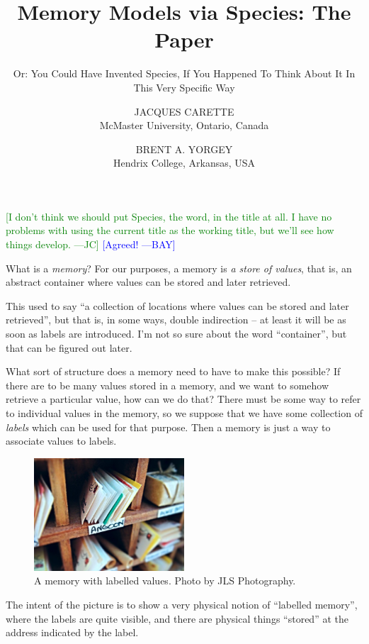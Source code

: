 \documentclass{jfp}
\title{Memory Models via Species: The Paper}
\subtitle{Or: You Could Have Invented Species, If You Happened To Think
  About It In This Very Specific Way}
\author[J. Carette and B. A. Yorgey]{JACQUES CARETTE\\
  McMaster University, Ontario, Canada \\
  \email{carette@mcmaster.ca}
  \and BRENT A. YORGEY\\
  Hendrix College, Arkansas, USA\\
  \email{yorgey@hendrix.edu}}
\newcommand{\term}[1]{\emph{#1}}
\newcommand{\authornote}[3]{\textcolor{#1}{[#3 ---#2]}}
\newcommand{\authornote}[3]{}
\newcommand{\bay}[1]{\authornote{blue}{BAY}{#1}}
\newcommand{\jc}[1]{\authornote{green}{JC}{#1}}  %
\begin{document}
\maketitle

\jc{I don't think we should put Species, the word,
  in the title at all. I have no problems with using the current
  title as the working title, but we'll see how things develop.}
\bay{Agreed!}

What is a \term{memory}?  For our purposes, a memory is \emph{a store
  of values}, that is, an abstract container where values can be
stored and later retrieved.

\begin{commentary}
  This used to say ``a collection of locations where
values can be stored and later retrieved'', but that is, in some
ways, double indirection -- at least it will be as soon as labels
are introduced.  I'm not so sure about the word ``container'', but
that can be figured out later.
\end{commentary}

What sort of structure does a memory need to have to make this
possible?  If there are to be many values stored in a memory, and we
want to somehow retrieve a particular value, how can we do that?
There must be some way to refer to individual values in the memory, so
we suppose that we have some collection of \emph{labels} which can be
used for that purpose. Then a memory is just a way to associate
values to labels.

\begin{figure}[htp]
  \centering
  \includegraphics[width=0.5\textwidth]{mailboxes.jpg}
  \caption{A memory with labelled values. Photo by JLS Photography.\protect\footnotemark}
  \label{fig:mailboxes}
\end{figure}

\begin{commentary}
  The intent of the picture is to show a very physical
notion of ``labelled memory'', where the labels are quite
visible, and there are physical things ``stored'' at the address
indicated by the label.
\end{commentary}
\end{document}
